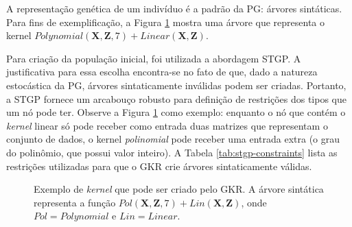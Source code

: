 A representação genética de um indivíduo é a padrão da PG: árvores sintáticas. Para fins de exemplificação, a Figura \ref{fig:kernel-tree} mostra uma árvore que representa o kernel $Polynomial(\mathbf{X}, \mathbf{Z}, 7) + Linear(\mathbf{X}, \mathbf{Z})$.

Para criação da população inicial, foi utilizada a abordagem STGP. A justificativa para essa escolha encontra-se no fato de que, dado a natureza estocástica da PG, árvores sintaticamente inválidas podem ser criadas. Portanto, a STGP fornece um arcabouço robusto para definição de restrições dos tipos que um nó pode ter. Observe a Figura \ref{fig:kernel-tree} como exemplo: enquanto o nó que contém o \textit{kernel} linear só pode receber como entrada duas matrizes que representam o conjunto de dados, o kernel \textit{polinomial} pode receber uma entrada extra (o grau do polinômio, que possui valor inteiro). A Tabela \ref{tab:stgp-constraints} lista as restrições utilizadas para que o GKR crie árvores sintaticamente válidas.



\begin{figure}[H]
    \caption{Exemplo de \textit{kernel} que pode ser criado pelo GKR. A árvore sintática representa a função $Pol(\mathbf{X}, \mathbf{Z}, 7) + Lin(\mathbf{X}, \mathbf{Z})$, onde $Pol=Polynomial$ e $Lin=Linear$.}
    \label{fig:kernel-tree}
    \begin{center}
    \end{center}
    \begin{center}
    \end{center}
\end{figure}

